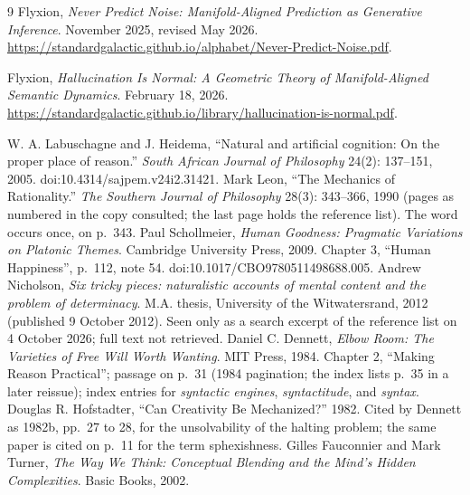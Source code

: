 \documentclass[11pt]{article}
\begin{document}
\begin{thebibliography}{9}
Flyxion, \emph{Never Predict Noise: Manifold-Aligned Prediction as Generative Inference}. November 2025, revised May 2026. \url{https://standardgalactic.github.io/alphabet/Never-Predict-Noise.pdf}.

Flyxion, \emph{Hallucination Is Normal: A Geometric Theory of Manifold-Aligned Semantic Dynamics}. February 18, 2026. \url{https://standardgalactic.github.io/library/hallucination-is-normal.pdf}.

 W. A. Labuschagne and J. Heidema, ``Natural and artificial cognition: On the proper place of reason.'' \emph{South African Journal of Philosophy} 24(2): 137--151, 2005. doi:10.4314/sajpem.v24i2.31421.
 Mark Leon, ``The Mechanics of Rationality.'' \emph{The Southern Journal of Philosophy} 28(3): 343--366, 1990 (pages as numbered in the copy consulted; the last page holds the reference list). The word occurs once, on p.\ 343.
 Paul Schollmeier, \emph{Human Goodness: Pragmatic Variations on Platonic Themes}. Cambridge University Press, 2009. Chapter 3, ``Human Happiness'', p.\ 112, note 54. doi:10.1017/CBO9780511498688.005.
 Andrew Nicholson, \emph{Six tricky pieces: naturalistic accounts of mental content and the problem of determinacy}. M.A. thesis, University of the Witwatersrand, 2012 (published 9 October 2012). Seen only as a search excerpt of the reference list on 4 October 2026; full text not retrieved.
 Daniel C. Dennett, \emph{Elbow Room: The Varieties of Free Will Worth Wanting}. MIT Press, 1984. Chapter 2, ``Making Reason Practical''; passage on p.\ 31 (1984 pagination; the index lists p.\ 35 in a later reissue); index entries for \emph{syntactic engines}, \emph{syntactitude}, and \emph{syntax}.
 Douglas R. Hofstadter, ``Can Creativity Be Mechanized?'' 1982. Cited by Dennett as 1982b, pp.\ 27 to 28, for the unsolvability of the halting problem; the same paper is cited on p.\ 11 for the term sphexishness.
 Gilles Fauconnier and Mark Turner, \emph{The Way We Think: Conceptual Blending and the Mind's Hidden Complexities}. Basic Books, 2002.
\end{thebibliography}
\end{document}
